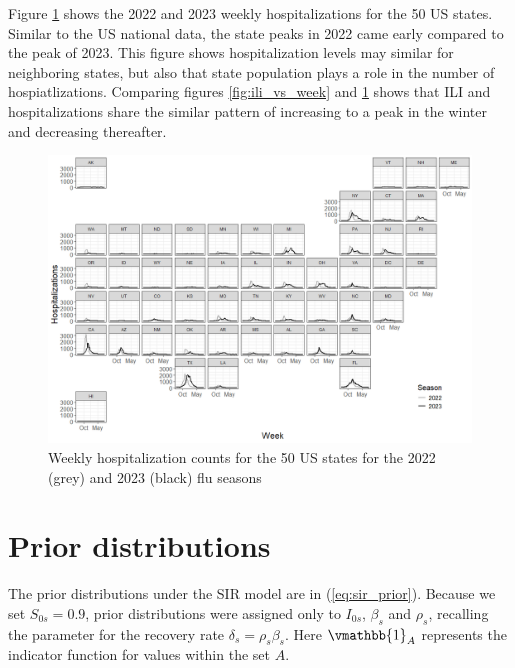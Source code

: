 \documentclass[ba]{imsart}
\theoremstyle{plain}
\theoremstyle{definition}
\theoremstyle{remark}
\begin{document}
\begin{supplement}
Figure \ref{fig:hosp_vs_week} shows the 2022 and 2023 weekly hospitalizations 
for the 50 US states. Similar to the US national data, 
the state peaks in 2022 came early compared to the peak of 2023. 
This figure shows hospitalization levels may similar for neighboring states,
but also that state population plays a role in the number of hospiatlizations.
Comparing figures 
\ref{fig:ili_vs_week} and \ref{fig:hosp_vs_week} shows that ILI and 
hospitalizations share the similar pattern of increasing to a peak in the 
winter and decreasing thereafter. 

\begin{figure}[hbt!]
    \centering
    \includegraphics[scale=.5]{Images/hosp_vs_week.png}
    \caption{Weekly hospitalization counts for the 50 US states for the 2022 
    (grey) and 2023 (black) flu seasons}
    \label{fig:hosp_vs_week}
\end{figure}













\section{Prior distributions} \label{app:B_prior}

The prior distributions under the SIR model are in (\ref{eq:sir_prior}).
Because we set $S_{0s} = 0.9$, prior distributions were assigned only to
$I_{0s}$, $\beta_s$ and $\rho_s$, recalling the parameter for the recovery
rate $\delta_s = \rho_s \beta_s$. Here $\vmathbb{1}_{A}$ represents the
indicator function for values within the set $A$.


\end{supplement}
\end{document}
